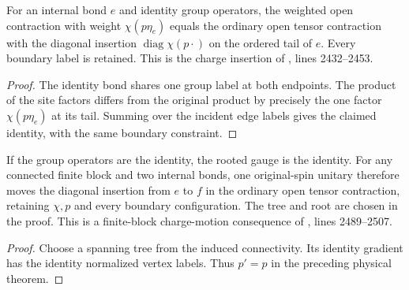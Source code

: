 \begin{lemma}
    \label{thm:peps_regular_weighted_charge_contraction}
    \leanok
    For an internal bond $e$ and identity group operators, the weighted open
    contraction with weight $\chi(p\eta_e)$ equals the ordinary open tensor
    contraction with the diagonal insertion $\operatorname{diag}\chi(p\cdot)$
    on the ordered tail of $e$. Every boundary label is retained.
    This is the charge insertion of \cite{Schuch2010PEPS}, lines
    2432--2453.
\end{lemma}
\begin{proof}\leanok
    The identity bond shares one group label at both endpoints. The product
    of the site factors differs from the original product by precisely the
    one factor $\chi(p\eta_e)$ at its tail. Summing over the incident
    edge labels gives the claimed identity, with the same boundary constraint.
\end{proof}

\begin{lemma}
    \label{thm:peps_regular_untwisted_physical_charge_motion}
    \leanok
    If the group operators are the identity, the rooted gauge is
    the identity. For any connected finite block and two internal bonds,
    one original-spin unitary therefore moves the diagonal insertion
    from $e$ to $f$ in the ordinary open tensor contraction, retaining $\chi,p$ and every boundary configuration. The tree and root
    are chosen in the proof. This is a finite-block charge-motion consequence
    of \cite{Schuch2010PEPS}, lines 2489--2507.
\end{lemma}
\begin{proof}\leanok
    Choose a spanning tree from the induced connectivity. Its identity
    gradient has the identity normalized vertex labels. Thus $p'=p$ in the
    preceding physical theorem.
\end{proof}
